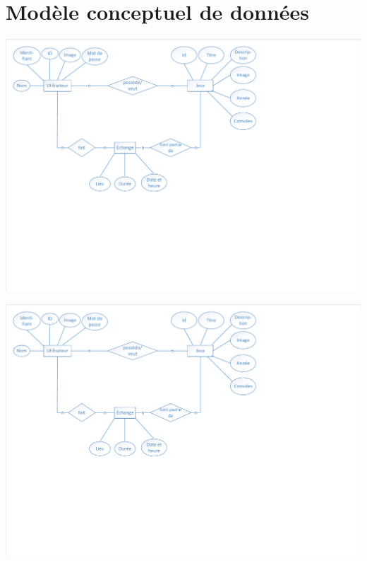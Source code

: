 \documentclass[a4paper,12pt,abstracton,titlepage]{scrartcl}
\begin{document}
\section{Modèle conceptuel de données}
\vspace{0.5cm}
\begin{minipage}[c]{\textwidth}
\centering
\includegraphics[width=\textwidth, trim=5mm 80mm 80mm 5mm, clip]{./doc/E-R-Diagrammme.pdf}
\label{img:er}
\vspace{1cm}

\includegraphics[width=\textwidth, trim=5mm 80mm 80mm 5mm, clip]{./doc/E-R-Diagrammme.pdf}
\label{img:mcd}
\end{minipage}
\end{document}
